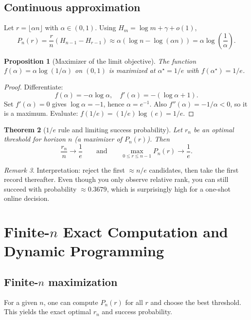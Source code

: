\documentclass[11pt]{article}
\theoremstyle{plain}
\newtheorem{theorem}{Theorem}[section]
\newtheorem{proposition}[theorem]{Proposition}
\theoremstyle{definition}
\theoremstyle{remark}
\newtheorem{remark}[theorem]{Remark}
\newcommand{\1}{\mathbf{1}}
\begin{document}
\subsection{Continuous approximation}
Let $r=\lfloor \alpha n \rfloor$ with $\alpha\in(0,1)$. Using $H_m=\log m + \gamma + o(1)$,
\[
P_n(r)
= \frac{r}{n}\left(H_{n-1}-H_{r-1}\right)
\approx \alpha\left(\log n - \log(\alpha n)\right)
= \alpha \log\left(\frac{1}{\alpha}\right).
\]

\begin{proposition}[Maximizer of the limit objective]
The function $f(\alpha)=\alpha\log(1/\alpha)$ on $(0,1)$ is maximized at $\alpha^\star=1/e$ with
$f(\alpha^\star)=1/e$.
\end{proposition}

\begin{proof}
Differentiate:
\[
f(\alpha)= -\alpha\log \alpha,\quad
f'(\alpha)=-(\log \alpha + 1).
\]
Set $f'(\alpha)=0$ gives $\log\alpha=-1$, hence $\alpha= e^{-1}$. Also
$f''(\alpha)= -1/\alpha<0$, so it is a maximum. Evaluate:
$f(1/e) = (1/e)\log(e)=1/e$.
\end{proof}

\begin{theorem}[$1/e$ rule and limiting success probability]
Let $r_n$ be an optimal threshold for horizon $n$ (a maximizer of $P_n(r)$). Then
\[
\frac{r_n}{n}\to \frac{1}{e}
\qquad\text{and}\qquad
\max_{0\le r\le n-1}P_n(r)\to \frac{1}{e}.
\]
\end{theorem}

\begin{remark}
Interpretation: reject the first $\approx n/e$ candidates, then take the first record thereafter.
Even though you only observe relative rank, you can still succeed with probability $\approx 0.3679$,
which is surprisingly high for a one-shot online decision.
\end{remark}

\section{Finite-\texorpdfstring{$n$}{n} Exact Computation and Dynamic Programming}
\subsection{Finite-\texorpdfstring{$n$}{n} maximization}
For a given $n$, one can compute $P_n(r)$ for all $r$ and choose the best threshold.
This yields the exact optimal $r_n$ and success probability.
\end{document}
